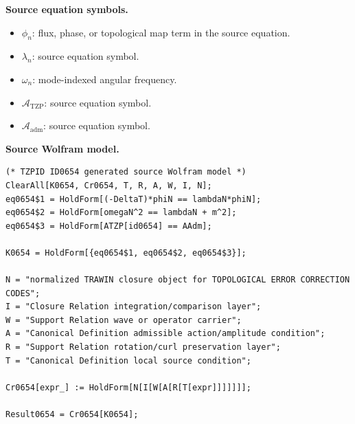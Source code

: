 \begin{minipage}[t]{0.49\linewidth}
\begingroup
\small
\raggedright
\textbf{Source equation symbols.}\par
\begin{itemize}[leftmargin=1.35em,itemsep=1pt,topsep=1pt,parsep=0pt]
    \item $\phi_n$: flux, phase, or topological map term in the source equation.
    \item $\lambda_n$: source equation symbol.
    \item $\omega_n$: mode-indexed angular frequency.
    \item $\mathcal{A}_{\mathrm{TZP}}$: source equation symbol.
    \item $\mathcal{A}_{\mathrm{adm}}$: source equation symbol.
\end{itemize}
\endgroup
\end{minipage}\hfill
\begin{minipage}[t]{0.47\linewidth}
\begingroup
\scriptsize
\raggedright
\textbf{Source Wolfram model.}\par
\begin{Verbatim}[fontsize=\tiny,breaklines=true,breakanywhere=true]
(* TZPID ID0654 generated source Wolfram model *)
ClearAll[K0654, Cr0654, T, R, A, W, I, N];
eq0654$1 = HoldForm[(-DeltaT)*phiN == lambdaN*phiN];
eq0654$2 = HoldForm[omegaN^2 == lambdaN + m^2];
eq0654$3 = HoldForm[ATZP[id0654] == AAdm];

K0654 = HoldForm[{eq0654$1, eq0654$2, eq0654$3}];

N = "normalized TRAWIN closure object for TOPOLOGICAL ERROR CORRECTION CODES";
I = "Closure Relation integration/comparison layer";
W = "Support Relation wave or operator carrier";
A = "Canonical Definition admissible action/amplitude condition";
R = "Support Relation rotation/curl preservation layer";
T = "Canonical Definition local source condition";

Cr0654[expr_] := HoldForm[N[I[W[A[R[T[expr]]]]]]];

Result0654 = Cr0654[K0654];
\end{Verbatim}
\endgroup
\end{minipage}

